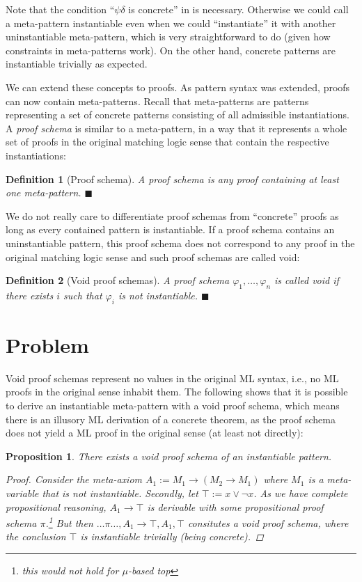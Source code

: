 \documentclass{article}
\newcommand{\xqed}[1]{%
    \leavevmode\unskip\penalty9999 \hbox{}\nobreak\hfill
    \quad\hbox{\ensuremath{#1}}}
\newcommand{\xqedhere}{\xqed{\blacksquare}}
\newtheorem{deff}{Definition}
\newenvironment{definition}[1]{%
  \begin{deff}#1}{%
  \xqedhere\end{deff}%
}
\numberwithin{deff}{section}
\numberwithin{lemma*}{section}
\newtheorem{proposition*}{Proposition}
\newcommand{\ML}{\textsf{ML}\xspace}
\begin{document}
Note that the condition ``$\psi\delta$ is concrete'' in  is necessary.
Otherwise we could call a meta-pattern instantiable even when we could ``instantiate'' it with another uninstantiable meta-pattern, which is very straightforward to do (given how constraints in meta-patterns work).
On the other hand, concrete patterns are instantiable trivially as expected.

We can extend these concepts to proofs.
As pattern syntax was extended, proofs can now contain meta-patterns.
Recall that meta-patterns are patterns representing a set of concrete patterns consisting of all admissible instantiations.
A \emph{proof schema} is similar to a meta-pattern, in a way that it represents a whole set of proofs in the original matching logic sense that contain the respective instantiations:
\begin{definition}[Proof schema]
  A \emph{proof schema} is any proof containing at least one meta-pattern.
\end{definition}

We do not really care to differentiate proof schemas from ``concrete'' proofs as long as every contained pattern is instantiable.
If a proof schema contains an uninstantiable pattern, this proof schema does not correspond to any proof in the original matching logic sense and such proof schemas are called void:
\begin{definition}[Void proof schemas]
  A proof schema $\varphi_1, \ldots, \varphi_n$ is called \emph{void} if there exists $i$ such that $\varphi_i$ is not instantiable.
\end{definition}

\section{Problem}

Void proof schemas represent no values in the original \ML syntax, i.e., no \ML proofs in the original sense inhabit them.
The following shows that it is possible to derive an instantiable meta-pattern with a void proof schema, which means there is an illusory \ML  derivation of a concrete theorem, as the proof schema does not yield a \ML proof in the original sense (at least not directly):
\begin{proposition*}
  There exists a void proof schema of an instantiable pattern.
  \begin{proof}
    Consider the meta-axiom $A_1 := M_1 \to (M_2 \to M_1)$ where $M_1$ is a meta-variable that is not instantiable.
    Secondly, let $\top := x \lor \neg x$.
    As we have complete propositional reasoning, $A_1 \to \top$ is derivable with some propositional proof schema $\pi$.\footnote{this would not hold for $\mu$-based top}
    But then $\ldots\pi\ldots, A_1 \to \top, A_1, \top$ consitutes a void proof schema, where the conclusion $\top$ is instantiable trivially (being concrete).
  \end{proof}
\end{proposition*}
\end{document}
